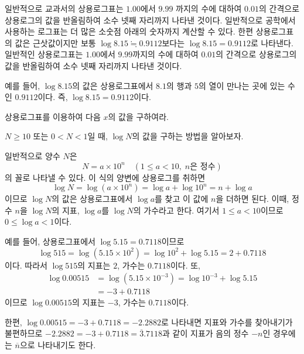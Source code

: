 \documentclass[11pt, a4paper]{book}
\begin{document}
일반적으로 교과서의 상용로그표는 $1.00$에서 $9.99$ 까지의 수에 대하여 $0.01$의 간격으로 상용로그의 값을 반올림하여 소수 넷째 자리까지 나타낸 것이다. 일반적으로 공학에서 사용하는 로그표는 더 많은 소숫점 아래의 숫자까지 계산할 수 있다. 한편 상용로그표의 값은 근삿값이지만 보통 $\log 8.15 \fallingdotseq 0.9112$보다는 $\log 8.15=0.9112$로 나타낸다.
일반적인 상용로그표는 $1.00$에서 $9.99$까지의 수에 대하여 $0.01$의 간격으로 상용로그의 값을 반올림하여 소수 넷째 자리까지 나타낸 것이다.

예를 들어, $\log 8.15$의 값은  상용로그표에서 $8.1$의 행과 $5$의 열이 만나는 곳에 있는 수인 $0.9112$이다. 즉, $\log 8.15=0.9112$이다.

\begin{sample}
\end{sample}

\begin{problem}
	상용로그표를 이용하여 다음 $x$의 값을 구하여라.
\end{problem}
$N ≥10$ 또는 $0<N<1$일 때, $\log N$의 값을 구하는 방법을 알아보자.

일반적으로 양수 $N$은
\[
N=a\times 10^{n}\quad (1≤a<10, \;n \text{은 정수})        
\]
의 꼴로 나타낼 수 있다. 이 식의 양변에 상용로그를 취하면
\[
\log N=\log(a\times 10^{n})=\log a+\log 10^{n}=n+\log a
\]
이므로 $\log N$의 값은 상용로그표에서 $\log a$를 찾고 이 값에 $n$을 더하면 된다. 이때, 정수 $n$을 $\log N$의 {\color{red}지표}, $\log a$를 $\log N$의 {\color{red}가수}라고 한다. 여기서 $1 \le a < 10$이므로 $0 \le \log a <1$이다.

예를 들어, 상용로그표에서 $\log 5.15=0.7118$이므로
\[
\log 515=\log(5.15\times 10^{2})=\log 10^{2}+\log 5.15=2+0.7118
\]
%
이다. 따라서 $\log 515$의 지표는 $2$, 가수는 $0.7118$이다. 또,
\begin{align*}
	\log 0.00515&=\log(5.15\times 10^{-3})=\log 10^{-3}+\log 5.15\\
	                     &=-3+0.7118
\end{align*}
이므로 $\log 0.00515$의 지표는 $-3$, 가수는 $0.7118$이다.

한편, $\log 0.00515=-3+0.7118=-2.2882$로 나타내면 지표와 가수를 찾아내기가 불편하므로 $-2.2882=-3+0.7118=\overline{3}.7118$과 같이 지표가 음의 정수 $-n$인 경우에는 $\overline{n}$으로 나타내기도 한다.
\end{document}
